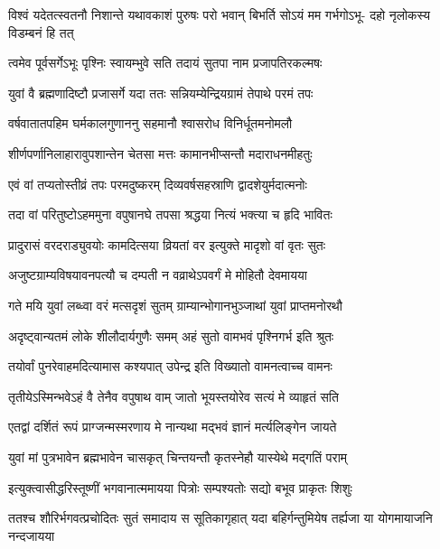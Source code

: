 \fourlineindentedshloka
{विश्वं यदेतत्स्वतनौ निशान्ते}
{यथावकाशं पुरुषः परो भवान्}
{बिभर्ति सोऽयं मम गर्भगोऽभू-}
{दहो नृलोकस्य विडम्बनं हि तत्} %



\twolineshloka
{त्वमेव पूर्वसर्गेऽभूः पृश्निः स्वायम्भुवे सति}
{तदायं सुतपा नाम प्रजापतिरकल्मषः} %

\twolineshloka
{युवां वै ब्रह्मणादिष्टौ प्रजासर्गे यदा ततः}
{सन्नियम्येन्द्रियग्रामं तेपाथे परमं तपः} %

\twolineshloka
{वर्षवातातपहिम घर्मकालगुणाननु}
{सहमानौ श्वासरोध विनिर्धूतमनोमलौ} %

\twolineshloka
{शीर्णपर्णानिलाहारावुपशान्तेन चेतसा}
{मत्तः कामानभीप्सन्तौ मदाराधनमीहतुः} %

\twolineshloka
{एवं वां तप्यतोस्तीव्रं तपः परमदुष्करम्}
{दिव्यवर्षसहस्राणि द्वादशेयुर्मदात्मनोः} %

\twolineshloka
{तदा वां परितुष्टोऽहममुना वपुषानघे}
{तपसा श्रद्धया नित्यं भक्त्या च हृदि भावितः} %

\twolineshloka
{प्रादुरासं वरदराड्युवयोः कामदित्सया}
{व्रियतां वर इत्युक्ते मादृशो वां वृतः सुतः} %

\twolineshloka
{अजुष्टग्राम्यविषयावनपत्यौ च दम्पती}
{न वव्राथेऽपवर्गं मे मोहितौ देवमायया} %

\twolineshloka
{गते मयि युवां लब्ध्वा वरं मत्सदृशं सुतम्}
{ग्राम्यान्भोगानभुञ्जाथां युवां प्राप्तमनोरथौ} %

\twolineshloka
{अदृष्ट्वान्यतमं लोके शीलौदार्यगुणैः समम्}
{अहं सुतो वामभवं पृश्निगर्भ इति श्रुतः} %

\twolineshloka
{तयोर्वां पुनरेवाहमदित्यामास कश्यपात्}
{उपेन्द्र इति विख्यातो वामनत्वाच्च वामनः} %

\twolineshloka
{तृतीयेऽस्मिन्भवेऽहं वै तेनैव वपुषाथ वाम्}
{जातो भूयस्तयोरेव सत्यं मे व्याहृतं सति} %

\twolineshloka
{एतद्वां दर्शितं रूपं प्राग्जन्मस्मरणाय मे}
{नान्यथा मद्भवं ज्ञानं मर्त्यलिङ्गेन जायते} %

\twolineshloka
{युवां मां पुत्रभावेन ब्रह्मभावेन चासकृत्}
{चिन्तयन्तौ कृतस्नेहौ यास्येथे मद्गतिं पराम्} %



\twolineshloka
{इत्युक्त्वासीद्धरिस्तूष्णीं भगवानात्ममायया}
{पित्रोः सम्पश्यतोः सद्यो बभूव प्राकृतः शिशुः} %

\fourlineindentedshloka
{ततश्च शौरिर्भगवत्प्रचोदितः}
{सुतं समादाय स सूतिकागृहात्}
{यदा बहिर्गन्तुमियेष तर्ह्यजा}
{या योगमायाजनि नन्दजायया} %


